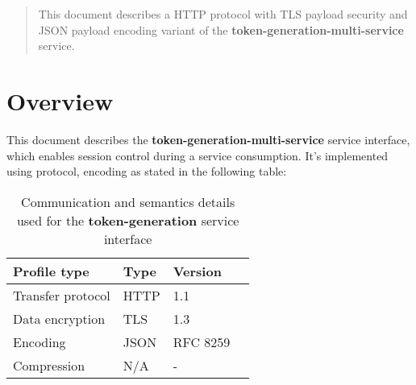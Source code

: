 \documentclass[a4paper]{arrowhead}
\begin{document}
\ArrowheadDate{\today}
\ArrowheadSetup

\begin{center}
  \vspace*{1cm}
  \huge{\arrowtitle}

  \vspace*{0.2cm}
  \LARGE{\arrowtype}
  \vspace*{1cm}
\end{center}

  \vspace*{\fill}


  \vspace*{1cm}
  \vspace*{\fill}

  \begin{abstract}
    This document describes a HTTP protocol with TLS payload
    security and JSON payload encoding variant of the \textbf{token-generation-multi-service} service.
  \end{abstract}
  \vspace*{1cm}

\newpage

\tableofcontents
\newpage

\section{Overview}
\label{sec:overview}

This document describes the \textbf{token-generation-multi-service} service interface, which enables session control during a service consumption. It's implemented using protocol, encoding as stated in the following table:

\begin{table}[ht!]
  \centering
  \begin{tabular}{|l|l|l|l|}
    \rowcolor{gray!33} Profile type & Type & Version \\ \hline
    Transfer protocol & HTTP & 1.1 \\ \hline
    Data encryption & TLS & 1.3 \\ \hline
    Encoding & JSON & RFC 8259 \cite{rfc8259} \\ \hline
    Compression & N/A & - \\ \hline
  \end{tabular}
  \caption{Communication and semantics details used for the \textbf{token-generation}
    service interface}
  \label{tab:comunication_semantics_profile}
\end{table}
\end{document}
